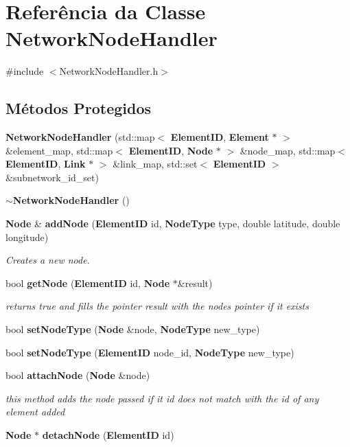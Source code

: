 \section{Referência da Classe Network\+Node\+Handler}
\label{class_network_node_handler}


{\ttfamily \#include $<$Network\+Node\+Handler.\+h$>$}

\subsection*{Métodos Protegidos}
\begin{DoxyCompactItemize}
\item 
{\bf Network\+Node\+Handler} (std\+::map$<$ {\bf Element\+ID}, {\bf Element} $\ast$ $>$ \&element\+\_\+map, std\+::map$<$ {\bf Element\+ID}, {\bf Node} $\ast$ $>$ \&node\+\_\+map, std\+::map$<$ {\bf Element\+ID}, {\bf Link} $\ast$ $>$ \&link\+\_\+map, std\+::set$<$ {\bf Element\+ID} $>$ \&subnetwork\+\_\+id\+\_\+set)
\item 
{\bf $\sim$\+Network\+Node\+Handler} ()
\item 
{\bf Node} \& {\bf add\+Node} ({\bf Element\+ID} id, {\bf Node\+Type} type, double latitude, double longitude)
\begin{DoxyCompactList}\small\item\em Creates a new node. \end{DoxyCompactList}\item 
bool {\bf get\+Node} ({\bf Element\+ID} id, {\bf Node} $\ast$\&result)
\begin{DoxyCompactList}\small\item\em returns true and fills the pointer result with the node\textquotesingle{}s pointer if it exists \end{DoxyCompactList}\item 
bool {\bf set\+Node\+Type} ({\bf Node} \&node, {\bf Node\+Type} new\+\_\+type)
\item 
bool {\bf set\+Node\+Type} ({\bf Element\+ID} node\+\_\+id, {\bf Node\+Type} new\+\_\+type)
\item 
bool {\bf attach\+Node} ({\bf Node} \&node)
\begin{DoxyCompactList}\small\item\em this method adds the node passed if it id does not match with the id of any element added \end{DoxyCompactList}\item 
{\bf Node} $\ast$ {\bf detach\+Node} ({\bf Element\+ID} id)

\end{DoxyCompactItemize}
